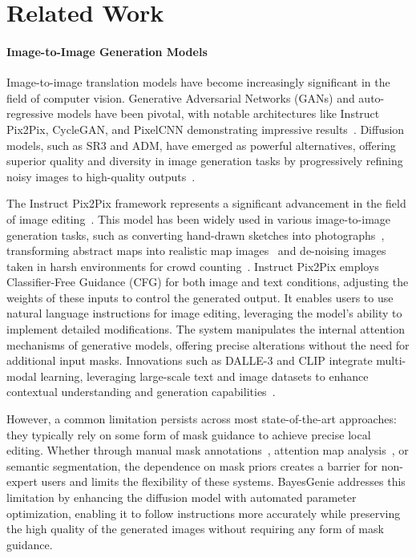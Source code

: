 \section{Related Work}
\paragraph{Image-to-Image Generation Models}
Image-to-image translation models have become increasingly significant in the field of computer vision. Generative Adversarial Networks (GANs) and auto-regressive models have been pivotal, with notable architectures like Instruct Pix2Pix, CycleGAN, and PixelCNN demonstrating impressive results~\cite{isola2017image,zhu2017unpaired,van2016pixel}. Diffusion models, such as SR3 and ADM, have emerged as powerful alternatives, offering superior quality and diversity in image generation tasks by progressively refining noisy images to high-quality outputs~\cite{saharia2022image,dhariwal2021diffusion}. 

The Instruct Pix2Pix framework represents a significant advancement in the field of image editing~\cite{brooks2023instructpix2pix}. This model has been widely used in various image-to-image generation tasks, such as converting hand-drawn sketches into photographs~\cite{m2022transfer}, transforming abstract maps into realistic map images~\cite{li2024mapping} and de-noising images taken in harsh environments for crowd counting~\cite{khan2023crowd}. Instruct Pix2Pix employs Classifier-Free Guidance (CFG) for both image and text conditions, adjusting the weights of these inputs to control the generated output. It enables users to use natural language instructions for image editing, leveraging the model's ability to implement detailed modifications. The system manipulates the internal attention mechanisms of generative models, offering precise alterations without the need for additional input masks. Innovations such as DALLE-3 and CLIP integrate multi-modal learning, leveraging large-scale text and image datasets to enhance contextual understanding and generation capabilities~\cite{betker2023improving,radford2021learning}. 

However, a common limitation persists across most state-of-the-art approaches: they typically rely on some form of mask guidance to achieve precise local editing. Whether through manual mask annotations~\cite{hertz2022prompt}, attention map analysis~\cite{li2024zone}, or semantic segmentation, the dependence on mask priors creates a barrier for non-expert users and limits the flexibility of these systems. BayesGenie addresses this limitation by enhancing the diffusion model with automated parameter optimization, enabling it to follow instructions more accurately while preserving the high quality of the generated images without requiring any form of mask guidance.


